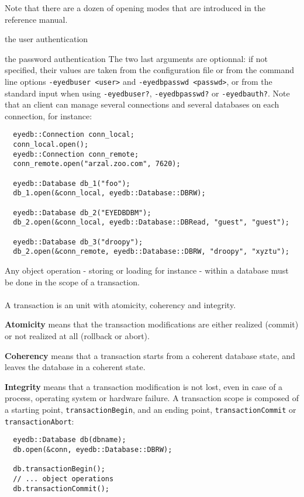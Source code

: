 Note that there are a dozen of opening modes that are introduced in
the reference manual.
\item the user authentication
\item the password authentication
\ee
The two last arguments are optionnal: if not specified, their values
are taken from the configuration file or from the command line options
\texttt{-eyedbuser <user>} and \texttt{-eyedbpasswd <passwd>}, or from
the standard input when using \texttt{-eyedbuser?}, \texttt{-eyedbpasswd?} or
\texttt{-eyedbauth?}.
\ee
Note that an \eyedb client can manage several connections and
several databases on each connection, for instance:
\verbsize
\begin{verbatim}
  eyedb::Connection conn_local;
  conn_local.open();
  eyedb::Connection conn_remote;
  conn_remote.open("arzal.zoo.com", 7620);

  eyedb::Database db_1("foo");
  db_1.open(&conn_local, eyedb::Database::DBRW);

  eyedb::Database db_2("EYEDBDBM");
  db_2.open(&conn_local, eyedb::Database::DBRead, "guest", "guest");

  eyedb::Database db_3("droopy");
  db_2.open(&conn_remote, eyedb::Database::DBRW, "droopy", "xyztu");
\end{verbatim}
\normalsize
{}
Any object operation - storing or loading for instance -
within a database must be done in the scope of a transaction.
\\
\\
A transaction is an unit with atomicity, coherency and integrity.
\be
\item {\bf Atomicity} means that the transaction modifications are either
realized (commit) or not realized at all (rollback or abort).
\item {\bf Coherency} means that a transaction starts from a coherent database
state, and leaves the database in a coherent state.
\item {\bf Integrity} means that a transaction modification is not lost, even
in case of a process, operating system or hardware failure.
\ee
A transaction scope is composed of a starting point, \texttt{transactionBegin},
and an ending point, \texttt{transactionCommit} or \texttt{transactionAbort}:
\verbsize
\begin{verbatim}
  eyedb::Database db(dbname);
  db.open(&conn, eyedb::Database::DBRW);

  db.transactionBegin();
  // ... object operations
  db.transactionCommit();
\end{verbatim}
